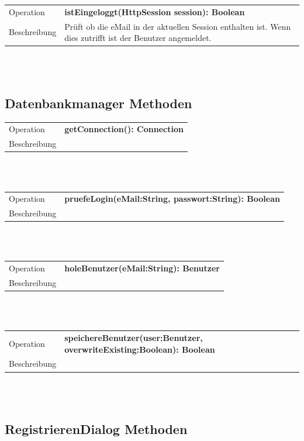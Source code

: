 \documentclass[12pt]{scrreprt}
\begin{document}
\begin{tabular}{|lp{12cm}|}
	\hline
	Operation &  \textbf{istEingeloggt(HttpSession session): Boolean }\\ 
	Beschreibung & Prüft ob die eMail in der aktuellen Session enthalten ist. Wenn dies zutrifft ist der Benutzer angemeldet.\\ 
	\hline 
\end{tabular} \\\\


\subsection{Datenbankmanager  Methoden}
\begin{tabular}{|lp{12cm}|}
	\hline
	Operation &  \textbf{getConnection(): Connection}\\ 
	Beschreibung & \\ 
	\hline 
\end{tabular} \\\\

\begin{tabular}{|lp{12cm}|}
	\hline
	Operation &  \textbf{pruefeLogin(eMail:String, passwort:String): Boolean}\\ 
	Beschreibung & \\ 
	\hline 
\end{tabular} \\\\

\begin{tabular}{|lp{12cm}|}
	\hline
	Operation &  \textbf{holeBenutzer(eMail:String): Benutzer}\\ 
	Beschreibung & \\ 
	\hline 
\end{tabular} \\\\

\begin{tabular}{|lp{12cm}|}
	\hline
	Operation &  \textbf{speichereBenutzer(user:Benutzer, overwriteExisting:Boolean): Boolean}\\ 
	Beschreibung & \\ 
	\hline 
\end{tabular} \\\\


\subsection{RegistrierenDialog  Methoden}
\end{document}
